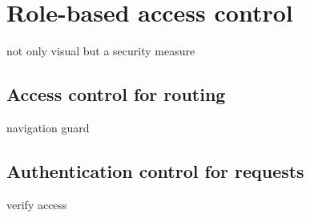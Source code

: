 \section{Role-based access control} not only visual but a security measure

\subsection{Access control for routing} navigation guard

\subsection{Authentication control for requests} verify access

